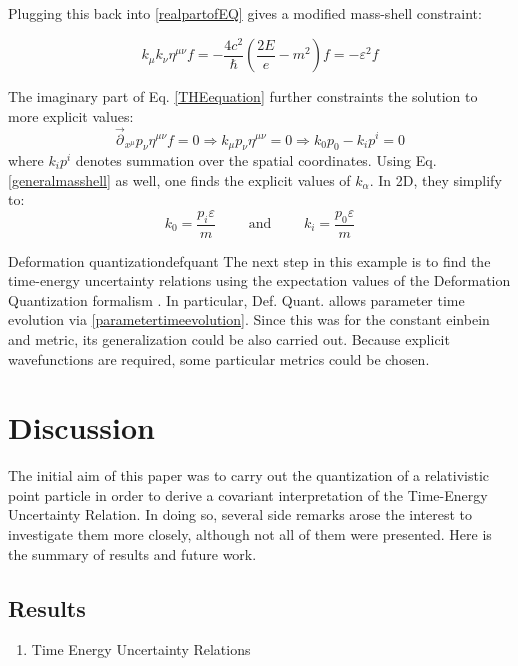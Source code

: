 \documentclass[a4paper,10pt]{article}
\numberwithin{equation}{section}
\newcommand{\parr}{\overset{\rightarrow}{\partial}}
\begin{document}
Plugging this back into \ref{realpartofEQ} gives a modified mass-shell constraint:

\begin{equation}
    k_\mu k_\nu \eta^{\mu\nu} f = - \frac{4 c^2}{\hbar} \left( \frac{2E}{e} - m^2 \right) f = -\varepsilon^2 f
    \label{generalmasshell}
\end{equation}

The imaginary part of Eq. \ref{THEequation} further constraints the solution to more explicit values:
\begin{equation}
     \parr_{x^\mu} p_\nu \eta^{\mu\nu} f = 0 \Rightarrow k_\mu p_\nu \eta^{\mu\nu}  = 0 \Rightarrow k_0 p_0 - k_i p^i = 0
\end{equation}
where $k_i p^i$ denotes summation over the spatial coordinates. Using Eq. \ref{generalmasshell} as well, one finds the explicit values of $k_\alpha$. In 2D, they simplify to:
\begin{equation}
k_0 = \frac{p_i \varepsilon}{m} \qquad \text{ and } \qquad k_i = \frac{p_0 \varepsilon}{m}
\end{equation}

\begin{futwork}{Deformation quantization}{defquant}
The next step in this example is to find the time-energy uncertainty relations using the expectation values of the Deformation Quantization formalism \cite{DefQuantPhys}. In particular, Def. Quant. allows parameter time evolution via \ref{parametertimeevolution}. Since this was for the constant einbein and metric, its generalization could be also carried out. Because explicit wavefunctions are required, some particular metrics could be chosen. 
\end{futwork}

\fi

\fi



\newpage


\section{Discussion}
\label{sec:discussion}
The initial aim of this paper was to carry out the quantization of a relativistic point particle in order to derive a covariant interpretation of the Time-Energy Uncertainty Relation. In doing so, several side remarks arose the interest to investigate them more closely, although not all of them were presented. Here is the summary of results and future work.

\subsection{Results}
\begin{enumerate}
    \item 
    Time Energy Uncertainty Relations
\end{enumerate}
\end{document}
